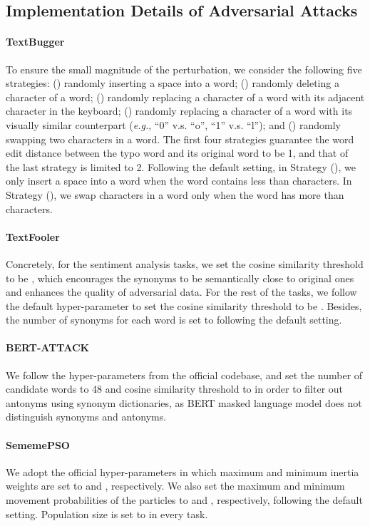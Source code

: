 \documentclass{article}
\begin{document}
\subsection{Implementation Details of Adversarial Attacks}
\label{appendix:imple}

\paragraph{TextBugger} 
To ensure the small magnitude of the perturbation, we consider the following five strategies: () randomly inserting a space into a word; () randomly deleting a character of a word; () randomly replacing a character of a word with its adjacent character in the keyboard; () randomly replacing a character of a word with its visually similar counterpart (\emph{e.g.}, ``0'' v.s. ``o'', ``1'' v.s. ``l''); and () randomly swapping two characters in a word. The first four strategies guarantee the word edit distance between the typo word and its original word to be 1, and that of the last strategy is limited to 2. Following the default setting, in Strategy (), we only insert a space into a word when the word contains less than  characters. In Strategy (), we swap characters in a word only when the word has more than  characters.

\paragraph{TextFooler}  Concretely, for the sentiment analysis tasks, we set the cosine similarity threshold to be , which encourages the synonyms to be semantically close to original ones and enhances the quality of adversarial data. For the rest of the tasks, we follow the default hyper-parameter to set the cosine similarity threshold to be . Besides, the number of synonyms for each word is set to  following the default setting.

\paragraph{BERT-ATTACK} We follow the hyper-parameters from the official codebase, and set the number of candidate words to 48 and cosine similarity threshold to  in order to filter out antonyms using synonym dictionaries, as BERT masked language model does not distinguish synonyms and antonyms. 

\paragraph{SememePSO} We adopt the official hyper-parameters in which maximum and minimum inertia weights are set to  and , respectively. We also set the maximum and minimum movement probabilities of the particles to  and , respectively, following the default setting. Population size is set to  in every task.
\end{document}
